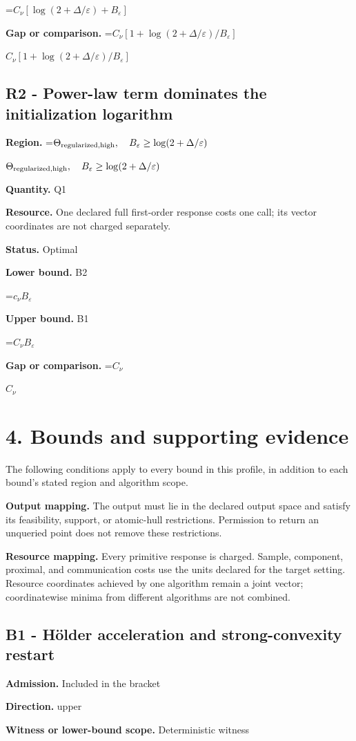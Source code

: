 \documentclass[10pt,a4paper]{article}
\newcommand{\AtlasMath}[1]{\par\begingroup\centering\setbox0=\hbox{$\displaystyle #1$}\ifdim\wd0>1.4\linewidth\typeout{ATLAS WIDE FORMULA: \the\wd0}\fi\ifdim\wd0>\linewidth\resizebox{\linewidth}{!}{\box0}\else\box0\fi\par\endgroup}
\newcommand{\AtlasInlineMath}[1]{\begingroup\setbox0=\hbox{$#1$}\ifdim\wd0>.4\linewidth\endgroup\AtlasMath{#1}\else\endgroup$#1$\fi}
\begin{document}
\AtlasMath{C_\nu[\log(2+\Delta/\varepsilon)+B_\varepsilon]}
\textbf{Gap or comparison.} \AtlasInlineMath{C_\nu[1+\log(2+\Delta/\varepsilon)/B_\varepsilon]}

\subsection{R2 - Power-law term dominates the initialization logarithm}
\textbf{Region.} \AtlasInlineMath{\Theta_{\rm regularized,high},\quad B_\varepsilon\ge\log(2+\Delta/\varepsilon)}

\textbf{Quantity.} Q1

\textbf{Resource.} One declared full first-order response costs one call; its vector coordinates are not charged separately.

\textbf{Status.} Optimal

\textbf{Lower bound.} B2

\AtlasMath{c_\nu B_\varepsilon}
\textbf{Upper bound.} B1

\AtlasMath{C_\nu B_\varepsilon}
\textbf{Gap or comparison.} \AtlasInlineMath{C_\nu}

\section{4. Bounds and supporting evidence}
The following conditions apply to every bound in this profile, in addition to each bound's stated region and algorithm scope.

\textbf{Output mapping.} The output must lie in the declared output space and satisfy its feasibility, support, or atomic-hull restrictions. Permission to return an unqueried point does not remove these restrictions.

\textbf{Resource mapping.} Every primitive response is charged. Sample, component, proximal, and communication costs use the units declared for the target setting. Resource coordinates achieved by one algorithm remain a joint vector; coordinatewise minima from different algorithms are not combined.

\subsection{B1 - Hölder acceleration and strong-convexity restart}
\textbf{Admission.} Included in the bracket

\textbf{Direction.} upper

\textbf{Witness or lower-bound scope.} Deterministic witness
\end{document}
